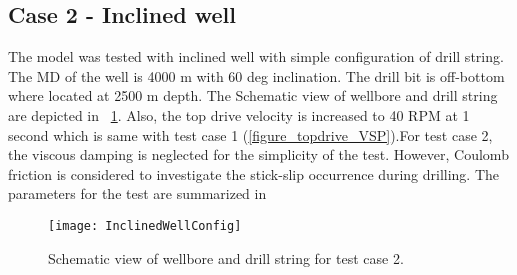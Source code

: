 
\newpage
\subsection{Case 2 - Inclined well}

The model was tested with inclined well with simple configuration of drill string. The MD of the well is 4000 m with 60 deg inclination. The drill bit is off-bottom where located at 2500 m depth. The Schematic view of wellbore and drill string are depicted in \figurename~\ref{figure_wellconfig_inclined}. Also, the top drive velocity is increased to 40 RPM at 1 second which is same with test case 1 (\figurename\ref{figure_topdrive_VSP}).For test case 2, the viscous damping is neglected for the simplicity of the test. However, Coulomb friction is considered to investigate the stick-slip occurrence during drilling. The parameters for the test are summarized in 

\begin{figure}[!hbt]
  \centering
  \texttt{[image: InclinedWellConfig]}
  \caption[Schematic view of test case 2.]{Schematic view of wellbore and drill string for test case 2.}\label{figure_wellconfig_inclined}
\end{figure}

